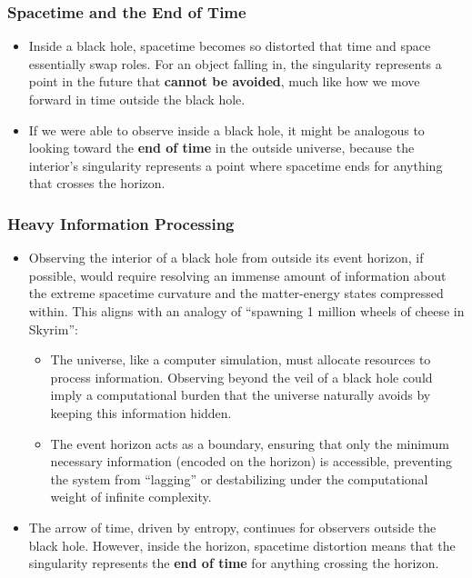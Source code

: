 \documentclass[12pt]{article}
\begin{document}
\subsubsection{Spacetime and the End of Time}
\begin{itemize}
    \item Inside a black hole, spacetime becomes so distorted that time and space essentially swap roles. For an object falling in, the singularity represents a point in the future that \textbf{cannot be avoided}, much like how we move forward in time outside the black hole.
    \item If we were able to observe inside a black hole, it might be analogous to looking toward the \textbf{end of time} in the outside universe, because the interior's singularity represents a point where spacetime ends for anything that crosses the horizon.
\end{itemize}

\subsubsection{Heavy Information Processing}
\begin{itemize}
    \item Observing the interior of a black hole from outside its event horizon, if possible, would require resolving an immense amount of information about the extreme spacetime curvature and the matter-energy states compressed within. This aligns with an analogy of ``spawning 1 million wheels of cheese in Skyrim'':
    \begin{itemize}
        \item The universe, like a computer simulation, must allocate resources to process information. Observing beyond the veil of a black hole could imply a computational burden that the universe naturally avoids by keeping this information hidden.
        \item The event horizon acts as a boundary, ensuring that only the minimum necessary information (encoded on the horizon) is accessible, preventing the system from ``lagging'' or destabilizing under the computational weight of infinite complexity.
    \end{itemize}
    
    \item The arrow of time, driven by entropy, continues for observers outside the black hole. However, inside the horizon, spacetime distortion means that the singularity represents the \textbf{end of time} for anything crossing the horizon.
\end{itemize}
\end{document}
